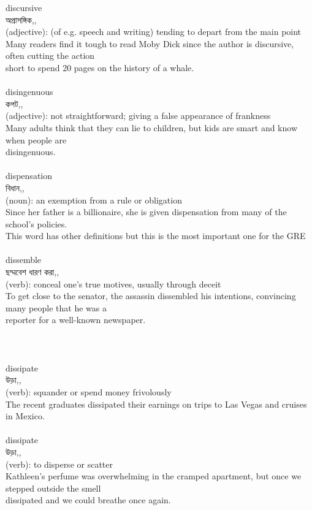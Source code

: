 \documentclass{article}
\begin{document}
{discursive}\\
{অপ্রাসঙ্গিক,,}\\
{(adjective): (of e.g. speech and writing) tending to depart from the main point\\Many readers find it tough to read Moby Dick since the author is discursive, often cutting the action\\short to spend 20 pages on the history of a whale.\\}\\
{disingenuous}\\
{কপট,,}\\
{(adjective): not straightforward; giving a false appearance of frankness\\Many adults think that they can lie to children, but kids are smart and know when people are\\disingenuous.\\}\\
{dispensation}\\
{বিধান,,}\\
{(noun): an exemption from a rule or obligation\\Since her father is a billionaire, she is given dispensation from many of the school's policies.\\This word has other definitions but this is the most important one for the GRE\\}\\
{dissemble}\\
{ছদ্মবেশ ধারণ করা,,}\\
{(verb): conceal one's true motives, usually through deceit\\To get close to the senator, the assassin dissembled his intentions, convincing many people that he was a\\reporter for a well-known newspaper.\\\\                                                                               \\}\\
{dissipate}\\
{উড়া,,}\\
{(verb): squander or spend money frivolously\\The recent graduates dissipated their earnings on trips to Las Vegas and cruises in Mexico.\\}\\
{dissipate}\\
{উড়া,,}\\
{(verb): to disperse or scatter\\Kathleen's perfume was overwhelming in the cramped apartment, but once we stepped outside the smell\\dissipated and we could breathe once again.\\}\\
\end{document}
